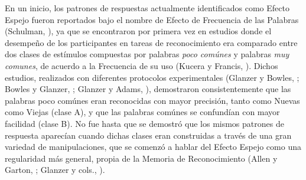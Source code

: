 \begin{itemize}


\end{itemize}

En un inicio, los patrones de respuestas actualmente identificados como Efecto Espejo fueron reportados bajo el nombre de Efecto de Frecuencia de las Palabras (Schulman, \citeyear{Schulman1967}), ya que se encontraron por primera vez en estudios donde el desempeño de los participantes en tareas de reconocimiento era comparado entre dos clases de estímulos compuestas por palabras \textit{poco comúnes} y palabras \textit{muy comunes}, de acuerdo a la Frecuencia de su uso (Kucera y Francis, \citeyear{Kucera1967}). Dichos estudios, realizados con diferentes protocolos experimentales (Glanzer y Bowles, \citeyear{Glanzer1976}; Bowles y Glanzer, \citeyear{Bowles1983}; Glanzer y Adams, \citeyear{Glanzer1990}), demostraron consistentemente que las palabras poco comúnes eran reconocidas con mayor precisión, tanto como Nuevas como Viejas (clase A), y que las palabras comúnes se confundían con mayor facilidad (clase B). No fue hasta que se demostró que los mismos patrones de respuesta aparecían cuando dichas clases eran construidas a través de una gran variedad de manipulaciones, que se comenzó a hablar del Efecto Espejo como una regularidad más general, propia de la Memoria de Reconocimiento (Allen y Garton, \citeyear{Allen1968}; Glanzer y cols., \citeyear{Glanzer1993}).\\

